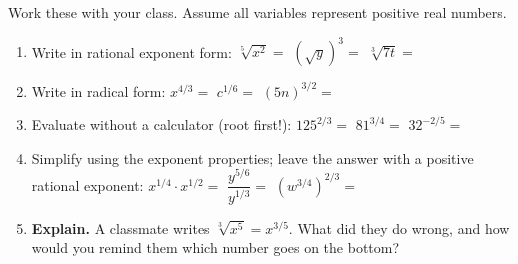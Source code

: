 \documentclass[10pt]{article}
\begin{document}
\begin{practicebox}
Work these with your class. Assume all variables represent positive real numbers.
\begin{enumerate}[leftmargin=1.7em, itemsep=5pt]
  \item Write in rational exponent form: \; $\sqrt[5]{x^{2}}=$  \quad
        $\left(\sqrt{y}\right)^{3}=$  \quad $\sqrt[3]{7t}=$ 
  \item Write in radical form: \; $x^{4/3}=$  \quad $c^{1/6}=$  \quad
        $(5n)^{3/2}=$ 
  \item Evaluate without a calculator (root first!): \; $125^{2/3}=$  \quad
        $81^{3/4}=$  \quad $32^{-2/5}=$ 
  \item Simplify using the exponent properties; leave the answer with a positive rational exponent:
        \; $x^{1/4}\cdot x^{1/2}=$  \quad $\dfrac{y^{5/6}}{y^{1/3}}=$  \quad
        $\left(w^{3/4}\right)^{2/3}=$ 
  \item \textbf{Explain.} A classmate writes $\sqrt[3]{x^{5}} = x^{3/5}$. What did they do wrong, and
        how would you remind them which number goes on the bottom? 
\end{enumerate}
\end{practicebox}
\end{document}

